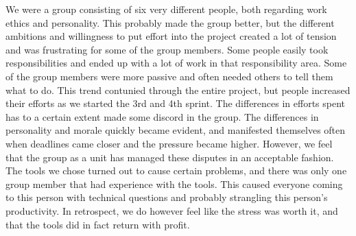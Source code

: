 \newline
\newline
We were a group consisting of six very different people, both regarding work ethics and personality. This probably made the group better, but the different ambitions and willingness to put effort into the project created a lot of tension and was frustrating for some of the group members. Some people easily took responsibilities and ended up with a lot of work in that responsibility area. Some of the group members  were more passive and often needed others to tell them what to do. This trend contunied through the entire project, but people increased their efforts as we started the 3rd and 4th sprint. The differences in efforts spent has to a certain extent made some discord in the group. 
\newline
\newline
The differences in personality and morale quickly became evident, and manifested themselves often when deadlines came closer and the pressure became higher. However, we feel that the group as a unit has managed these disputes in an acceptable fashion. The tools we chose turned out to cause certain problems, and there was only one group member that had experience with the tools. This caused everyone coming to this person with technical questions and probably strangling this person's productivity. In retrospect, we do however feel like the stress was worth it, and that the tools did in fact return with profit.

